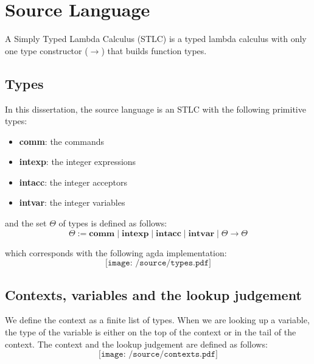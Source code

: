 \documentclass[12pt,twoside,a4paper]{report}
\theoremstyle{definition}
\theoremstyle{definition}
\theoremstyle{definition}
\theoremstyle{definition}
\begin{document}
    \section{Source Language}
    A Simply Typed Lambda Calculus (STLC) is a typed lambda calculus with only one type constructor ($\to$) that builds function types. 
    
        \subsection{Types}
        In this dissertation, the source language is an STLC with the following primitive types:
        \begin{itemize}
            \item 
                \textbf{comm}: the commands
            \item 
                \textbf{intexp}: the integer expressions
            \item 
                \textbf{intacc}: the integer acceptors
            \item 
                \textbf{intvar}: the integer variables
        \end{itemize}
        and the set $\Theta$ of types is defined as follows:
        \[ \Theta := \textbf{comm} \mid \textbf{intexp} \mid \textbf{intacc} \mid \textbf{intvar} \mid \Theta \to \Theta \]

        which corresponds with the following agda implementation:
        \[\texttt{[image: /source/types.pdf]}\]

        \subsection{Contexts, variables and the lookup judgement}
        We define the context as a finite list of types. When we are looking up a variable, the type of the variable is either on the top of the context or in the tail of the context. The context and the lookup judgement are defined as follows:
        \[\texttt{[image: /source/contexts.pdf]}\]
\end{document}
